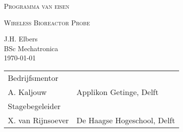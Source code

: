 \documentclass[12pt]{article}
\begin{document}
	\begin{titlepage}
		\centering
		\vspace{5cm}
		{\scshape\LARGE Programma van eisen \par}
		{\scshape\large Wireless Bioreactor Probe\par}
		
		
		\vspace{1.2cm}
		{J.H. Elbers\\}
		{BSc Mechatronica \\}
		{\today}
		\vfill
		\vfill

	\begin{tabular}{p{4cm}l} 
		Bedrijfsmentor &  \\
		A. Kaljouw & Applikon Getinge, Delft \\
		
		\medskip
		Stagebegeleider & \\ 
		X. van Rijnsoever & De Haagse Hogeschool, Delft \\
		
		
	\end{tabular}

\textit{}

\end{titlepage} 
\rmfamily
\pagestyle{default}


\newpage







\renewcommand\refname{Literatuurlijst}


\end{document}
